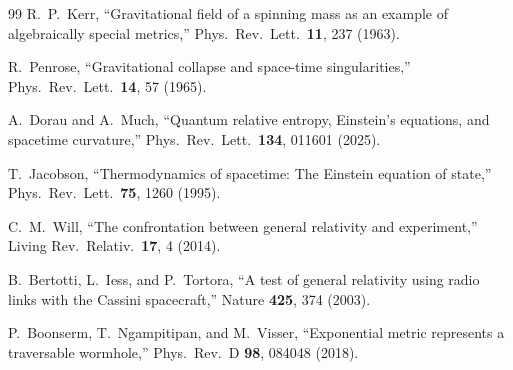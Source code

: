 \documentclass[12pt]{article}
\begin{document}
\begin{thebibliography}{99}
R.~P.~Kerr,
``Gravitational field of a spinning mass as an example of algebraically
special metrics,''
Phys.\ Rev.\ Lett.\ \textbf{11}, 237 (1963).

R.~Penrose,
``Gravitational collapse and space-time singularities,''
Phys.\ Rev.\ Lett.\ \textbf{14}, 57 (1965).

A.~Dorau and A.~Much,
``Quantum relative entropy, Einstein's equations, and spacetime curvature,''
Phys.\ Rev.\ Lett.\ \textbf{134}, 011601 (2025).

T.~Jacobson,
``Thermodynamics of spacetime: The Einstein equation of state,''
Phys.\ Rev.\ Lett.\ \textbf{75}, 1260 (1995).

C.~M.~Will,
``The confrontation between general relativity and experiment,''
Living Rev.\ Relativ.\ \textbf{17}, 4 (2014).

B.~Bertotti, L.~Iess, and P.~Tortora,
``A test of general relativity using radio links with the Cassini spacecraft,''
Nature \textbf{425}, 374 (2003).

P.~Boonserm, T.~Ngampitipan, and M.~Visser,
``Exponential metric represents a traversable wormhole,''
Phys.\ Rev.\ D \textbf{98}, 084048 (2018).

\end{thebibliography}
\endgroup
\end{document}
